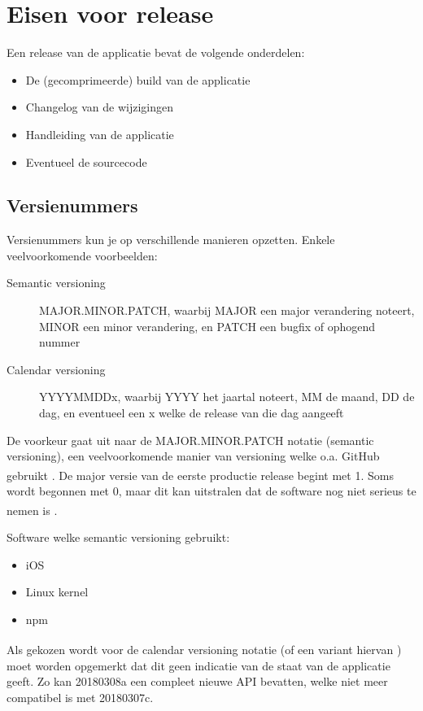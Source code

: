 \documentclass[12pt]{article}
\begin{document}
\pagebreak
\section{Eisen voor release}
Een release van de applicatie bevat de volgende onderdelen:
\begin{itemize}
	\item De (gecomprimeerde) build van de applicatie
	\item Changelog van de wijzigingen
	\item Handleiding van de applicatie
	\item Eventueel de sourcecode
\end{itemize}

\subsection{Versienummers}
Versienummers kun je op verschillende manieren opzetten. Enkele veelvoorkomende voorbeelden:
\begin{description}
	\item [Semantic versioning] MAJOR.MINOR.PATCH, waarbij MAJOR een major verandering noteert, MINOR een minor verandering, en PATCH een bugfix of ophogend nummer
	\item [Calendar versioning] YYYYMMDDx, waarbij YYYY het jaartal noteert, MM de maand, DD de dag, en eventueel een x welke de release van die dag aangeeft
\end{description}

\bigskip
\noindent De voorkeur gaat uit naar de MAJOR.MINOR.PATCH notatie (semantic versioning), een veelvoorkomende manier van versioning welke o.a. GitHub gebruikt \textsuperscript{\cite{semantic_versioning}}. De major versie van de eerste productie release begint met 1. Soms wordt begonnen met 0, maar dit kan uitstralen dat de software nog niet serieus te nemen is \textsuperscript{\cite{semantic_versioning}}.

Software welke semantic versioning gebruikt:
\begin{itemize}
	\item iOS
	\item Linux kernel
	\item npm
\end{itemize}

\bigskip
\noindent Als gekozen wordt voor de calendar versioning notatie (of een variant hiervan \textsuperscript{\cite{calendar_versioning}}) moet worden opgemerkt dat dit geen indicatie van de staat van de applicatie geeft. Zo kan 20180308a een compleet nieuwe API bevatten, welke niet meer compatibel is met 20180307c.
\end{document}
